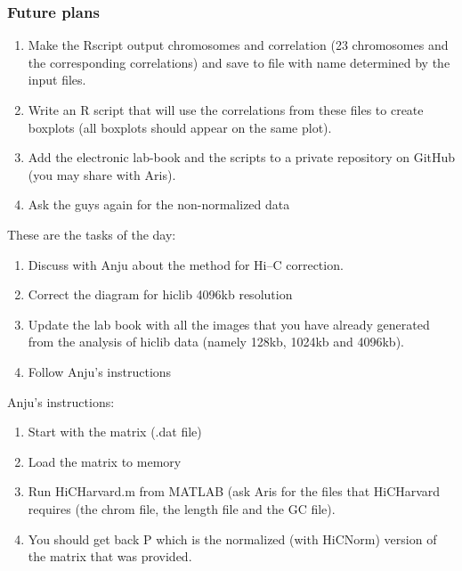 \documentclass[idxtotoc,hyperref,openany]{labbook} %
\begin{document}
\subsubsection*{Future plans}

\begin{enumerate}
  \item Make the Rscript output chromosomes and correlation
  (23 chromosomes and the corresponding correlations) and save
  to file with name determined by the input files.
  \item Write an R script that will use the correlations
  from these files to create boxplots (all boxplots should
  appear on the same plot).
  \item Add the electronic lab-book and the scripts to a private
  repository on GitHub (you may share with Aris).
  \item Ask the guys again for the non-normalized data
\end{enumerate}




These are the tasks of the day:

\begin{enumerate}
	\item Discuss with Anju about the method for Hi--C correction.
	\item Correct the diagram for hiclib 4096kb resolution
	\item Update the lab book with all the images that you have already generated from the analysis of hiclib data (namely 128kb, 1024kb and 4096kb).
	\item Follow Anju's instructions
\end{enumerate}

Anju's instructions:

\begin{enumerate}
	\item Start with the matrix (.dat file)
	\item Load the matrix to memory
	\item Run HiCHarvard.m from MATLAB (ask Aris for the files
	that HiCHarvard requires (the chrom file, the length file and the GC file).
	\item You should get back P which is the normalized (with HiCNorm) version of the matrix that was provided. 
\end{enumerate}
    
\end{document}
